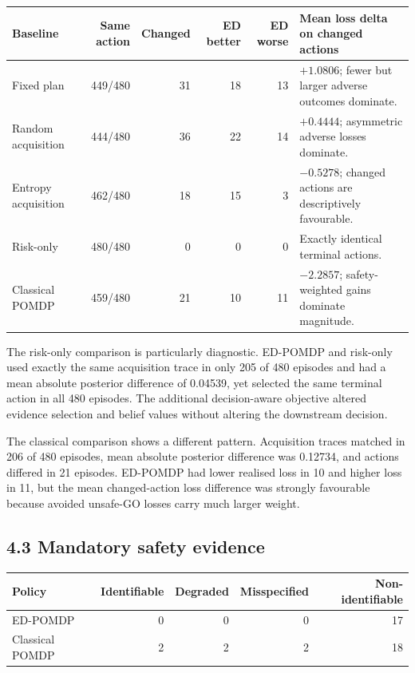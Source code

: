 \documentclass[11pt,a4paper]{article}
\begin{document}
\begin{center}
\small
\begin{tabularx}{\textwidth}{lrrrrX}
\toprule
Baseline & Same action & Changed & ED better & ED worse & Mean loss delta on changed actions \\
\midrule
Fixed plan & 449/480 & 31 & 18 & 13 & $+1.0806$; fewer but larger adverse outcomes dominate. \\
Random acquisition & 444/480 & 36 & 22 & 14 & $+0.4444$; asymmetric adverse losses dominate. \\
Entropy acquisition & 462/480 & 18 & 15 & 3 & $-0.5278$; changed actions are descriptively favourable. \\
Risk-only & 480/480 & 0 & 0 & 0 & Exactly identical terminal actions. \\
Classical POMDP & 459/480 & 21 & 10 & 11 & $-2.2857$; safety-weighted gains dominate magnitude. \\
\bottomrule
\end{tabularx}
\end{center}

The risk-only comparison is particularly diagnostic. ED-POMDP and risk-only used exactly the same acquisition trace in only 205 of 480 episodes and had a mean absolute posterior difference of 0.04539, yet selected the same terminal action in all 480 episodes. The additional decision-aware objective altered evidence selection and belief values without altering the downstream decision.

The classical comparison shows a different pattern. Acquisition traces matched in 206 of 480 episodes, mean absolute posterior difference was 0.12734, and actions differed in 21 episodes. ED-POMDP had lower realised loss in 10 and higher loss in 11, but the mean changed-action loss difference was strongly favourable because avoided unsafe-GO losses carry much larger weight.

\subsection*{4.3 Mandatory safety evidence}

\begin{center}
\begin{tabular}{lrrrr}
\toprule
Policy & Identifiable & Degraded & Misspecified & Non-identifiable \\
\midrule
ED-POMDP & 0 & 0 & 0 & 17 \\
Classical POMDP & 2 & 2 & 2 & 18 \\
\bottomrule
\end{tabular}
\end{center}
\end{document}
